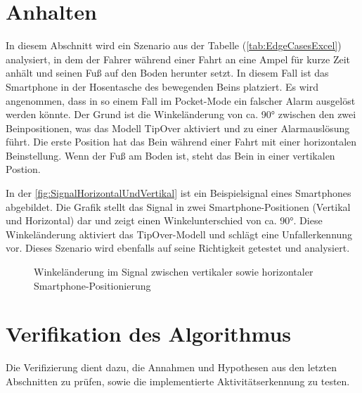 




\section{Anhalten} \label{sec:AmpelStehen}
In diesem Abschnitt wird ein Szenario aus der Tabelle (\autoref{tab:EdgeCasesExcel}) analysiert, in dem der Fahrer während einer Fahrt an eine Ampel für kurze Zeit anhält und seinen Fuß auf den Boden herunter setzt. In diesem Fall ist das Smartphone in der Hosentasche des bewegenden Beins platziert.
Es wird angenommen, dass in so einem Fall im Pocket-Mode ein falscher Alarm ausgelöst werden könnte. Der Grund ist die Winkeländerung von ca. \ang{90} zwischen den zwei Beinpositionen, was das Modell \glqq TipOver\grqq{} aktiviert und zu einer Alarmauslösung führt.
Die erste Position hat das Bein während einer Fahrt mit einer horizontalen Beinstellung. Wenn der Fuß am Boden ist, steht das Bein in einer vertikalen Postion.

In der \autoref{fig:SignalHorizontalUndVertikal} ist ein Beispielsignal eines Smartphones abgebildet. Die Grafik stellt das Signal in zwei Smartphone-Positionen (Vertikal und Horizontal) dar und zeigt einen Winkelunterschied von ca. \ang{90}. Diese Winkeländerung aktiviert das \glqq TipOver\grqq{}-Modell und schlägt eine Unfallerkennung vor.
Dieses Szenario wird ebenfalls auf seine Richtigkeit getestet und analysiert.

\begin{figure}[htpb]
	\centering
	\caption{Winkeländerung im Signal zwischen vertikaler sowie horizontaler Smart\-phone\--Position\-ierung}
	\label{fig:SignalHorizontalUndVertikal}
\end{figure}



\section{Verifikation des Algorithmus}
Die Verifizierung dient dazu, die Annahmen und Hypothesen aus den letzten Abschnitten zu prüfen, sowie die implementierte Aktivitätserkennung zu testen.


